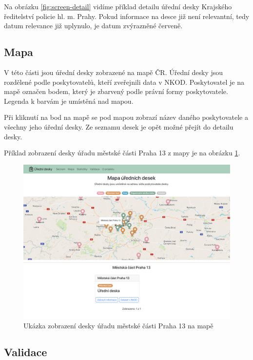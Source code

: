Na obrázku \ref{fig:screen-detail} vidíme příklad detailu úřední desky Krajského ředitelství policie
hl. m. Prahy. Pokud informace na desce již není relevantní, tedy datum relevance již
uplynulo, je datum zvýrazněné červeně.

\subsection*{Mapa}\label{mapa}

V této části jsou úřední desky zobrazené na mapě ČR. Úřední desky jsou
rozdělené podle poskytovatelů, kteří zveřejnili data v NKOD.
Poskytovatel je na mapě označen bodem, který je zbarvený podle právní
formy poskytovatele. Legenda k barvám je umístěná nad mapou.

Při kliknutí na bod na mapě se pod mapou zobrazí název daného
poskytovatele a všechny jeho úřední desky. Ze seznamu desek je opět
možné přejít do detailu desky.

Příklad zobrazení desky úřadu městské části Praha 13 z mapy je na obrázku \ref{fig:screen-mapa}.

\begin{figure}
\centering
\includegraphics[width=\textwidth]{cs/obrazky/screenshots/mapa.png}
\caption{Ukázka zobrazení desky úřadu městské části Praha 13 na mapě}
\label{fig:screen-mapa}
\end{figure}

\subsection*{Validace}\label{validace}

